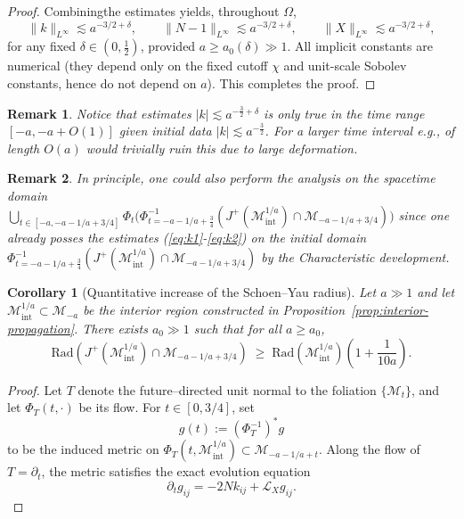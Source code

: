 \documentclass{amsart}
\newtheorem{remark}{Remark}
\newtheorem{corollary}{Corollary}[section]
\begin{document}
{\begin{proof}
\medskip
\noindent Combiningthe estimates yields, throughout $\Omega$,
\[
\|k\|_{L^\infty}\lesssim a^{-3/2+\delta},\qquad
\|N-1\|_{L^\infty}\lesssim a^{-3/2+\delta},\qquad
\|X\|_{L^\infty}\lesssim a^{-3/2+\delta},
\]
for any fixed $\delta\in(0,\tfrac12)$, provided $a\ge a_0(\delta)\gg 1$. All implicit constants are numerical (they depend
only on the fixed cutoff $\chi$ and unit-scale Sobolev constants, hence do not depend on $a$).
This completes the proof.
\end{proof}
\begin{remark}
Notice that estimates $|k|\lesssim a^{-\frac{3}{2}+\delta}$ is only true in the time range $[-a,-a+O(1)]$ given initial data $|k|\lesssim a^{-\frac{3}{2}}$. For a larger time interval e.g., of length $O(a)$ would trivially ruin this due to large deformation. 
\end{remark}

\begin{remark}
In principle, one could also perform the analysis on the spacetime domain\\ $\bigcup_{t\in [-a,-a-1/a+3/4]}\Phi_{t}\bigg(\Phi^{-1}_{t=-a-1/a+\frac{3}{4}}(J^+(\mathcal M^{1/a}_{\mathrm{int}})
\cap
\mathcal M_{-a-1/a+3/4})\bigg)$ since one already posses the estimates (\ref{eq:k1}-\ref{eq:k2}) on the initial domain  $\Phi^{-1}_{t=-a-1/a+\frac{3}{4}}(J^+(\mathcal M^{1/a}_{\mathrm{int}})
\cap
\mathcal M_{-a-1/a+3/4})$ by the Characteristic development.     
\end{remark}

\noindent 


\begin{corollary}[Quantitative increase of the Schoen--Yau radius]
\label{Hradius}
Let $a\gg1$ and let $\mathcal M^{1/a}_{\mathrm{int}}\subset\mathcal M_{-a}$ be the interior region constructed in Proposition~\ref{prop:interior-propagation}. There exists $a_0\gg1$ such that for all $a\ge a_0$,
\[
\mathrm{Rad}\!\left(J^+(\mathcal M^{1/a}_{\mathrm{int}})\cap \mathcal M_{-a-1/a+3/4}\right)
\;\ge\;
\mathrm{Rad}(\mathcal M^{1/a}_{\mathrm{int}})
\left(1+\frac{1}{10a}\right).
\]
\end{corollary}

\begin{proof}
Let $T$ denote the future--directed unit normal to the foliation $\{\mathcal M_t\}$, and let $\Phi_T(t,\cdot)$ be its flow. For $t\in[0,3/4]$, set
\[
g(t):=(\Phi_T^{-1})^{*}g
\]
to be the induced metric on $\Phi_T(t,\mathcal M^{1/a}_{\mathrm{int}})\subset\mathcal M_{-a-1/a+t}$. Along the flow of $T=\partial_{t}$, the metric satisfies the exact evolution equation
\begin{equation}\label{eq:metric-transport}
\partial_t g_{ij}=-2Nk_{ij}+\mathscr L_X g_{ij}.
\end{equation}


\end{proof}}
\end{document}
